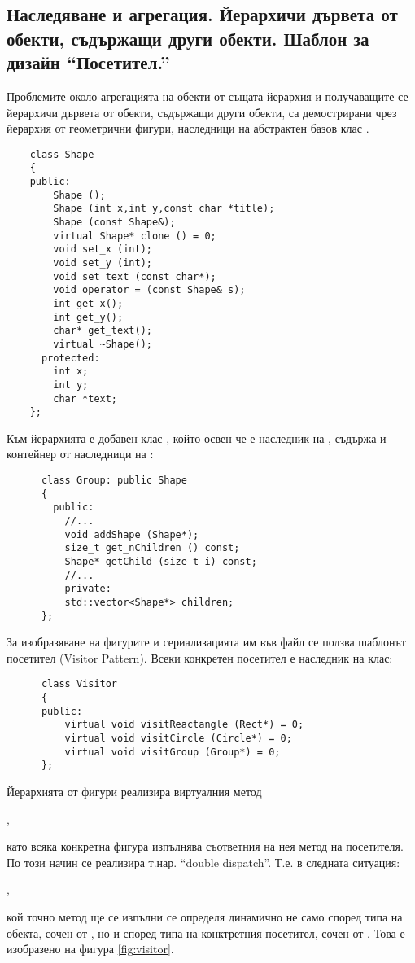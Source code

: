 \pagebreak

\subsection {Наследяване и агрегация. Йерархичи дървета от обекти, съдържащи други обекти. Шаблон за дизайн ``Посетител.''}

\begin{mdframed}[hidealllines=true,backgroundcolor=gray!20]
  Проблемите около агрегацията на обекти от същата йерархия и получаващите се йерархичи дървета от обекти, съдържащи други обекти, са демострирани чрез йерархия от геометрични фигури, наследници на абстрактен базов клас .
  \begin{verbatim}
    class Shape
    {
    public:
        Shape ();
        Shape (int x,int y,const char *title);
        Shape (const Shape&);
        virtual Shape* clone () = 0;    
        void set_x (int);
        void set_y (int);
        void set_text (const char*);
        void operator = (const Shape& s);
        int get_x();
        int get_y();
        char* get_text();
        virtual ~Shape();
      protected:
        int x;
        int y;
        char *text;
    };
    \end{verbatim}
    
    Към йерархията е добавен клас , който освен че е наследник на , съдържа и контейнер от наследници на :

    \begin{verbatim}
      class Group: public Shape
      {
        public:
          //...
          void addShape (Shape*);
          size_t get_nChildren () const;
          Shape* getChild (size_t i) const;
          //...
          private:
          std::vector<Shape*> children;
      };
    \end{verbatim}

    За изобразяване на фигурите и сериализацията им във файл се ползва шаблонът посетител (Visitor Pattern). Всеки конкретен посетител е наследник на клас:
    \begin{verbatim}
      class Visitor
      {
      public:
          virtual void visitReactangle (Rect*) = 0;
          virtual void visitCircle (Circle*) = 0;
          virtual void visitGroup (Group*) = 0;
      };  
    \end{verbatim}

    Йерархията от фигури реализира виртуалния метод 
    
    , 
    
    като всяка конкретна фигура изпълнява съответния на нея метод на посетителя. По този начин се реализира т.нар. ``double dispatch''. Т.е. в следната ситуация:

    ,
    
    кой точно метод ще се изпълни се определя динамично не само според типа на обекта, сочен от , но и според типа на конктретния посетител, сочен от . Това е изобразено на фигура \ref{fig:visitor}.
  \end{mdframed}

